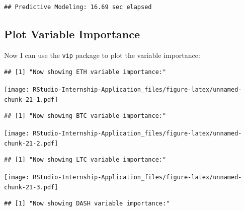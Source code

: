 \documentclass[
]{book}
\newenvironment{Shaded}{\begin{snugshade}}{\end{snugshade}}
\newcommand{\ControlFlowTok}[1]{\textcolor[rgb]{0.13,0.29,0.53}{\textbf{#1}}}
\newcommand{\DecValTok}[1]{\textcolor[rgb]{0.00,0.00,0.81}{#1}}
\newcommand{\KeywordTok}[1]{\textcolor[rgb]{0.13,0.29,0.53}{\textbf{#1}}}
\newcommand{\NormalTok}[1]{#1}
\newcommand{\OperatorTok}[1]{\textcolor[rgb]{0.81,0.36,0.00}{\textbf{#1}}}
\newcommand{\StringTok}[1]{\textcolor[rgb]{0.31,0.60,0.02}{#1}}
\begin{document}
\begin{verbatim}
## Predictive Modeling: 16.69 sec elapsed
\end{verbatim}

\hypertarget{plot-variable-importance}{%
\subsection{Plot Variable Importance}\label{plot-variable-importance}}

Now I can use the \texttt{vip} \citep{R-vip} package to plot the variable importance:

\begin{Shaded}
\end{Shaded}

\begin{verbatim}
## [1] "Now showing ETH variable importance:"
\end{verbatim}

\texttt{[image: RStudio-Internship-Application\_files/figure-latex/unnamed-chunk-21-1.pdf]}

\begin{verbatim}
## [1] "Now showing BTC variable importance:"
\end{verbatim}

\texttt{[image: RStudio-Internship-Application\_files/figure-latex/unnamed-chunk-21-2.pdf]}

\begin{verbatim}
## [1] "Now showing LTC variable importance:"
\end{verbatim}

\texttt{[image: RStudio-Internship-Application\_files/figure-latex/unnamed-chunk-21-3.pdf]}

\begin{verbatim}
## [1] "Now showing DASH variable importance:"
\end{verbatim}
\end{document}
